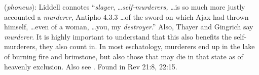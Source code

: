\item[Murderer,]

(\textit{phoneus}):
Liddell connotes ``\emph{slayer}, \ldots \emph{self-murderers,} \ldots is so much more justly accounted a \emph{murderer}, Antipho 4.3.3 \ldots of the sword on which Ajax had thrown himself, \ldots even of a woman, \ldots you, my \emph{destroyer}.'' Also, Thayer and Gingrich say \emph{murderer}. It is highly important to understand that this also benefits the self-murderers, they also count in. In most eschatology, murderers end up in the lake of burning fire and brimstone, but also those that may die in that state as of heavenly exclusion. Also see .
Found in Rev 21:8, 22:15.
